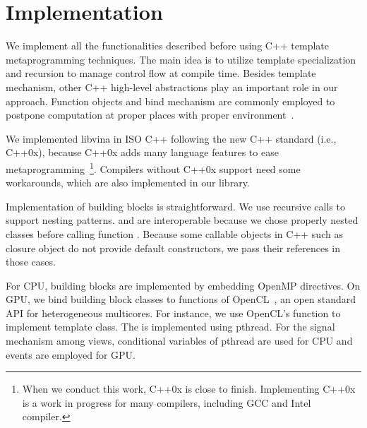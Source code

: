 \section{Implementation}
\label{sec:details}

We implement all the functionalities described before using C++
template metaprogramming techniques.
The main idea is to utilize
template specialization and recursion to manage control flow at
compile time. Besides template mechanism, other C++ high-level
abstractions play an important role in our approach.
Function objects and bind mechanism are commonly employed to postpone computation
at proper places with proper environment~\cite{moderncpp}.

We implemented libvina in ISO C++ following the new C++ standard (i.e., C++0x\cite{c++0x}),
because C++0x adds many language features to ease metaprogramming~\footnote{When
we conduct this work, C++0x is close to finish. Implementing C++0x is a work in
progress for many compilers, including GCC and Intel compiler.}. Compilers
without C++0x support need some workarounds, which are also implemented in our
library.

Implementation of building blocks is straightforward. We use recursive calls
to support nesting patterns.  and  are interoperable
because we chose properly nested classes before calling function .
Because some callable objects in C++ such as closure object
do not provide default constructors, we pass their
references in those cases. 

For CPU, building blocks are implemented by embedding OpenMP directives. On GPU, we bind
building block classes to functions of OpenCL~\cite{opencl}, an open standard API
for heterogeneous multicores. For instance, we use OpenCL's  function
to implement  template class. The  is implemented using pthread.
For the signal mechanism among views, conditional variables of pthread are used
for CPU and events are employed for GPU.

